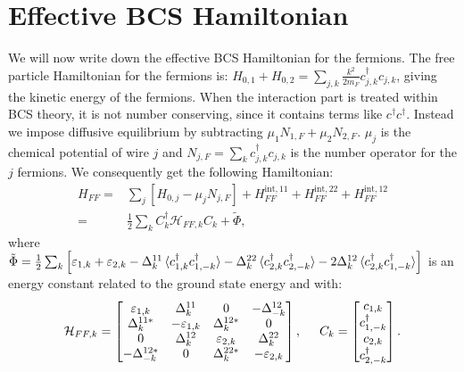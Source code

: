 \section{Effective BCS Hamiltonian} \label{sec.HFFfull}
We will now write down the effective BCS Hamiltonian for the fermions. The free particle Hamiltonian for the fermions is: $H_{0,1} + H_{0,2} = \sum_{j,k}\frac{k^2}{2m_F}c^\dagger_{j,k}c_{j,k}$, giving the kinetic energy of the fermions. When the interaction part is treated within BCS theory, it is not number conserving, since it contains terms like $c^\dagger c^\dagger$. Instead we impose diffusive equilibrium by subtracting $\mu_1N_{1,F}+\mu_2N_{2,F}$. $\mu_j$ is the chemical potential of wire $j$ and $N_{j,F} = \sum_k c^\dagger_{j,k}c_{j,k}$ is the number operator for the $j$ fermions. We consequently get the following Hamiltonian:
\begin{align}
H_{FF} = &\sum_j \left[H_{0,j} - \mu_j N_{j,F}\right] + H^{\text{int},11}_{FF} + H^{\text{int},22}_{FF} + H^{\text{int},12}_{FF} \nonumber \\
       = &\frac{1}{2}\sum_k C^\dagger_k \mathcal{H}_{FF,k}C_k + \tilde{\Phi}, 
\label{eq.BCSHamiltonian}
\end{align}
where $\tilde{\Phi} = \frac{1}{2}\sum_k\left[\varepsilon_{1,k} + \varepsilon_{2,k} - \Delta^{11}_k\braket{c^\dagger_{1,k}c^\dagger_{1,-k}} - \Delta^{22}_k\braket{c^\dagger_{2,k}c^\dagger_{2,-k}} - 2\Delta^{12}_k\braket{c^\dagger_{2,k}c^\dagger_{1,-k}} \right]$ is an energy constant related to the ground state energy and with:
\begin{equation}
\mathcal{H}_{FF,k} = \begin{bmatrix} \varepsilon_{1,k} & \Delta^{11}_k      & 0                 & -\Delta^{12}_{-k} \\ 
                                     \Delta^{11 *}_k   & -\varepsilon_{1,k} & \Delta^{12*}_k    & 0 \\ 
                                    0                  & \Delta^{12}_k      & \varepsilon_{2,k} & \Delta^{22}_k \\ 
                                     -\Delta^{12*}_{-k}& 0                  & \Delta^{22*}_k    & -\varepsilon_{2,k} \end{bmatrix}, \hspace{0.5cm}
C_k =  \begin{bmatrix} c_{1,k} \\ c^\dagger_{1,-k} \\ c_{2,k} \\ c^\dagger_{2,-k} \end{bmatrix}.                                     
\end{equation}
